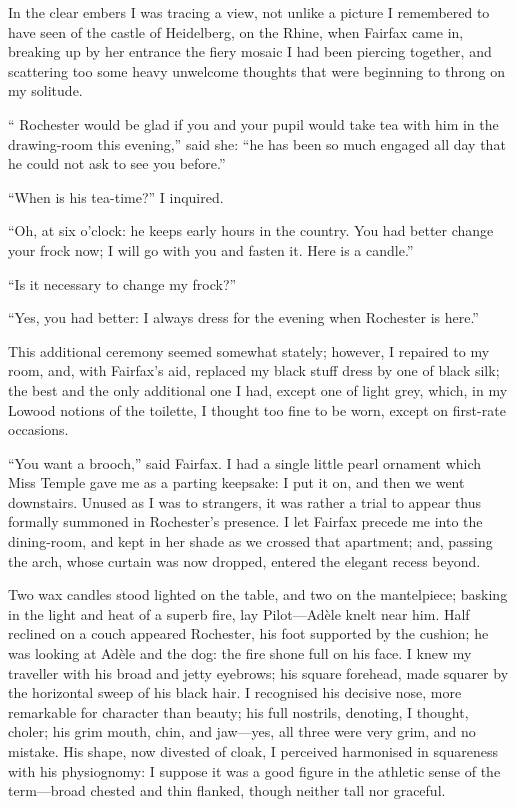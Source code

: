 In the clear embers I was tracing a view, not unlike a picture I
remembered to have seen of the castle of Heidelberg, on the Rhine, when
\Mrs{} Fairfax came in, breaking up by her entrance the fiery mosaic I had
been piercing together, and scattering too some heavy unwelcome thoughts
that were beginning to throng on my solitude.

\enquote{\Mr{} Rochester would be glad if you and your pupil would take
tea with him in the drawing-room this evening,} said she: \enquote{he
has been so much engaged all day that he could not ask to see you
before.}

\enquote{When is his tea-time?} I inquired.

\enquote{Oh, at six o'clock: he keeps early hours in the country. You
had better change your frock now; I will go with you and fasten it. 
Here is a candle.}

\enquote{Is it necessary to change my frock?}

\enquote{Yes, you had better: I always dress for the evening when \Mr{}
 Rochester is here.}

This additional ceremony seemed somewhat stately; however, I repaired to
my room, and, with \Mrs{} Fairfax's aid, replaced my black stuff dress by
one of black silk; the best and the only additional one I had, except
one of light grey, which, in my Lowood notions of the toilette, I
thought too fine to be worn, except on first-rate occasions.

\enquote{You want a brooch,} said \Mrs{} Fairfax. I had a single little
pearl ornament which Miss Temple gave me as a parting keepsake: I put it
on, and then we went downstairs. Unused as I was to strangers, it was
rather a trial to appear thus formally summoned in \Mr{} Rochester's
presence. I let \Mrs{} Fairfax precede me into the dining-room, and kept
in her shade as we crossed that apartment; and, passing the arch, whose
curtain was now dropped, entered the elegant recess beyond.

Two wax candles stood lighted on the table, and two on the mantelpiece;
basking in the light and heat of a superb fire, lay Pilot---Adèle knelt
near him. Half reclined on a couch appeared \Mr{} Rochester, his foot
supported by the cushion; he was looking at Adèle and the dog: the fire
shone full on his face. I knew my traveller with his broad and jetty
eyebrows; his square forehead, made squarer by the horizontal sweep of
his black hair. I recognised his decisive nose, more remarkable for
character than beauty; his full nostrils, denoting, I thought, choler;
his grim mouth, chin, and jaw---yes, all three were very grim, and no
mistake. His shape, now divested of cloak, I perceived harmonised in
squareness with his physiognomy: I suppose it was a good figure in the
athletic sense of the term---broad chested and thin flanked, though
neither tall nor graceful.

